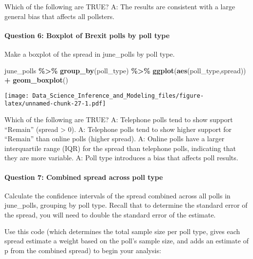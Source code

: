 \documentclass[
]{article}
\newenvironment{Shaded}{\begin{snugshade}}{\end{snugshade}}
\newcommand{\KeywordTok}[1]{\textcolor[rgb]{0.13,0.29,0.53}{\textbf{#1}}}
\newcommand{\NormalTok}[1]{#1}
\newcommand{\OperatorTok}[1]{\textcolor[rgb]{0.81,0.36,0.00}{\textbf{#1}}}
\newcommand{\StringTok}[1]{\textcolor[rgb]{0.31,0.60,0.02}{#1}}
\begin{document}
Which of the following are TRUE? A: The results are consistent with a
large general bias that affects all pollsters.

\hypertarget{question-6-boxplot-of-brexit-polls-by-poll-type}{%
\paragraph{Question 6: Boxplot of Brexit polls by poll
type}\label{question-6-boxplot-of-brexit-polls-by-poll-type}}

Make a boxplot of the spread in june\_polls by poll type.

\begin{Shaded}
\begin{Highlighting}[]
\NormalTok{june\_polls }\OperatorTok{\%\textgreater{}\%}\StringTok{ }\KeywordTok{group\_by}\NormalTok{(poll\_type) }\OperatorTok{\%\textgreater{}\%}
\StringTok{  }\KeywordTok{ggplot}\NormalTok{(}\KeywordTok{aes}\NormalTok{(poll\_type,spread)) }\OperatorTok{+}
\StringTok{  }\KeywordTok{geom\_boxplot}\NormalTok{()}
\end{Highlighting}
\end{Shaded}

\texttt{[image: Data\_Science\_Inference\_and\_Modeling\_files/figure-latex/unnamed-chunk-27-1.pdf]}

Which of the following are TRUE? A: Telephone polls tend to show support
``Remain'' (spread \textgreater{} 0). A: Telephone polls tend to show
higher support for ``Remain'' than online polls (higher spread). A:
Online polls have a larger interquartile range (IQR) for the spread than
telephone polls, indicating that they are more variable. A: Poll type
introduces a bias that affects poll results.

\hypertarget{question-7-combined-spread-across-poll-type}{%
\paragraph{Question 7: Combined spread across poll
type}\label{question-7-combined-spread-across-poll-type}}

Calculate the confidence intervals of the spread combined across all
polls in june\_polls, grouping by poll type. Recall that to determine
the standard error of the spread, you will need to double the standard
error of the estimate.

Use this code (which determines the total sample size per poll type,
gives each spread estimate a weight based on the poll's sample size, and
adds an estimate of p from the combined spread) to begin your analysis:
\end{document}
